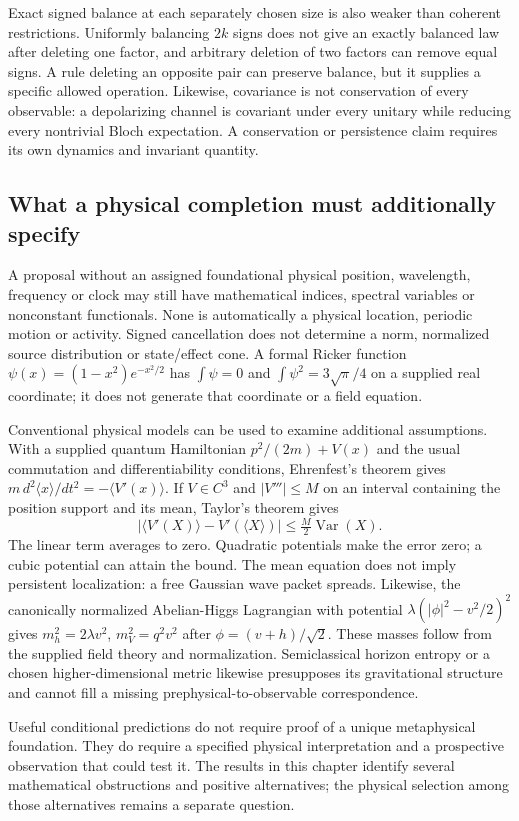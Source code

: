 Exact signed balance at each separately chosen size is also weaker than coherent restrictions. Uniformly balancing $2k$ signs does not give an exactly balanced law after deleting one factor, and arbitrary deletion of two factors can remove equal signs. A rule deleting an opposite pair can preserve balance, but it supplies a specific allowed operation. Likewise, covariance is not conservation of every observable: a depolarizing channel is covariant under every unitary while reducing every nontrivial Bloch expectation. A conservation or persistence claim requires its own dynamics and invariant quantity.

\subsection{What a physical completion must additionally specify}
\label{str:physical}
A proposal without an assigned foundational physical position, wavelength, frequency or clock may still have mathematical indices, spectral variables or nonconstant functionals. None is automatically a physical location, periodic motion or activity. Signed cancellation does not determine a norm, normalized source distribution or state/effect cone. A formal Ricker function
$\psi(x)=(1-x^2)e^{-x^2/2}$ has $\int\psi=0$ and $\int\psi^2=3\sqrt\pi/4$ on a supplied real coordinate; it does not generate that coordinate or a field equation.

Conventional physical models can be used to examine additional assumptions. With a supplied quantum Hamiltonian $p^2/(2m)+V(x)$ and the usual commutation and differentiability conditions, Ehrenfest's theorem gives $m\,d^2\langle x\rangle/dt^2=-\langle V'(x)\rangle$. If $V\in C^3$ and $|V'''|\le M$ on an interval containing the position support and its mean, Taylor's theorem gives
\[
 |\langle V'(X)\rangle-V'(\langle X\rangle)|\le\tfrac M2\operatorname{Var}(X).
\]
The linear term averages to zero. Quadratic potentials make the error zero; a cubic potential can attain the bound. The mean equation does not imply persistent localization: a free Gaussian wave packet spreads. Likewise, the canonically normalized Abelian-Higgs Lagrangian with potential $\lambda(|\phi|^2-v^2/2)^2$ gives $m_h^2=2\lambda v^2$, $m_V^2=q^2v^2$ after $\phi=(v+h)/\sqrt2$. These masses follow from the supplied field theory and normalization. Semiclassical horizon entropy or a chosen higher-dimensional metric likewise presupposes its gravitational structure and cannot fill a missing prephysical-to-observable correspondence.

Useful conditional predictions do not require proof of a unique metaphysical foundation. They do require a specified physical interpretation and a prospective observation that could test it. The results in this chapter identify several mathematical obstructions and positive alternatives; the physical selection among those alternatives remains a separate question.
